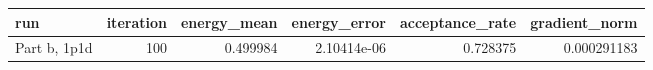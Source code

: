 \begin{tabular}{lrrrrr}
\toprule
run & iteration & energy_mean & energy_error & acceptance_rate & gradient_norm \\
\midrule
Part b, 1p1d & 100 & 0.499984 & 2.10414e-06 & 0.728375 & 0.000291183 \\
\bottomrule
\end{tabular}
